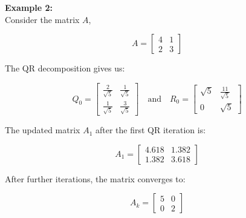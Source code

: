 \documentclass[journal]{IEEEtran}
\begin{document}
\textbf{Example 2:}\\
Consider the matrix \( A \),

\[
A = \begin{bmatrix}
	4 & 1 \\
	2 & 3
\end{bmatrix}
\]

The QR decomposition gives us:

\[
Q_0 = \begin{bmatrix}
	\frac{2}{\sqrt{5}} & \frac{1}{\sqrt{5}} \\
	\frac{1}{\sqrt{5}} & \frac{3}{\sqrt{5}}
\end{bmatrix}
\quad \text{and} \quad
R_0 = \begin{bmatrix}
	\sqrt{5} & \frac{11}{\sqrt{5}} \\
	0 & \sqrt{5}
\end{bmatrix}
\]

The updated matrix \( A_1 \) after the first QR iteration is:

\[
A_1 = \begin{bmatrix}
	4.618 & 1.382 \\
	1.382 & 3.618
\end{bmatrix}
\]

After further iterations, the matrix converges to:

\[
A_k = \begin{bmatrix}
	5 & 0 \\
	0 & 2
\end{bmatrix}
\]
\end{document}
